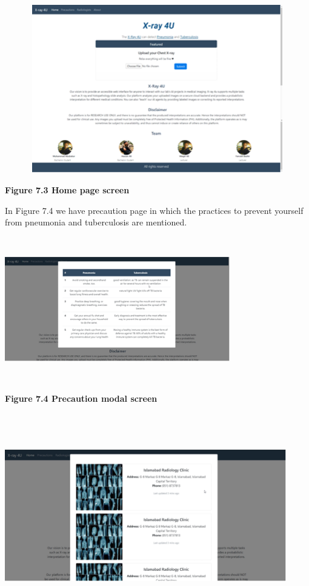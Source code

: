 \documentclass{article} %
\begin{document}
\noindent \includegraphics*[width=5.70in, height=2.89in, keepaspectratio=false, trim=0.00in 0.98in 0.09in 0.00in]{image36}

\noindent \textbf{Figure 7.3 Home page screen}

\noindent In Figure 7.4 we have precaution page in which the practices to prevent yourself from pneumonia and tuberculosis are mentioned.

\noindent \includegraphics*[width=3.86in, height=2.49in, keepaspectratio=false, trim=2.02in 0.72in 2.06in 0.39in]{image37}

\noindent \textbf{Figure 7.4 Precaution modal screen}

\noindent \includegraphics*[width=4.83in, height=3.51in, keepaspectratio=false, trim=2.55in 0.72in 2.71in 0.48in]{image38}
\end{document}
